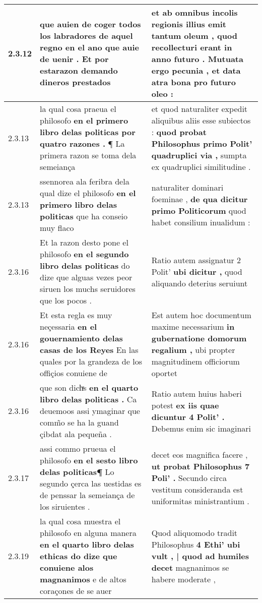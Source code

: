 \begin{tabular}{|p{1cm}|p{6.5cm}|p{6.5cm}|}
2.3.12 & que auien de coger todos los labradores de aquel regno \textbf{ en el ano que auie de uenir . } Et por estarazon demando dineros prestados & et ab omnibus incolis regionis illius emit tantum oleum , \textbf{ quod recollecturi erant in anno futuro . } Mutuata ergo pecunia , et data atra bona pro futuro oleo : \\\hline
2.3.13 & la qual cosa praeua el philosofo \textbf{ en el primero libro delas politicas por quatro razones . } ¶ La primera razon se toma dela semeiança & et quod naturaliter expedit aliquibus aliis esse subiectos : \textbf{ quod probat Philosophus primo Polit’ quadruplici via , } sumpta ex quadruplici similitudine . \\\hline
2.3.13 & ssennorea ala feribra dela qual dize el philosofo \textbf{ en el primero libro delas politicas } que ha conseio muy flaco & naturaliter dominari foeminae , \textbf{ de qua dicitur primo Politicorum } quod habet consilium inualidum : \\\hline
2.3.16 & Et la razon desto pone el philosofo \textbf{ en el segundo libro delas politicas } do dize que alguas vezes peor siruen los muchs seruidores que los pocos . & Ratio autem assignatur 2 Polit’ \textbf{ ubi dicitur , } quod aliquando deterius seruiunt \\\hline
2.3.16 & Et esta regla es muy neçessaria \textbf{ en el gouernamiento delas casas de los Reyes } En las quales por la grandeza de los offiçios conuiene de & Est autem hoc documentum maxime necessarium \textbf{ in gubernatione domorum regalium , } ubi propter magnitudinem officiorum oportet \\\hline
2.3.16 & que son dichͣs \textbf{ en el quarto libro delas politicas . } Ca deuemoos assi ymaginar que comm̃o se ha la guand çibdat ala pequeña . & Ratio autem huius haberi potest \textbf{ ex iis quae dicuntur 4 Polit’ . } Debemus enim sic imaginari \\\hline
2.3.17 & assi commo prueua el philosofo \textbf{ en el sesto libro delas politicas¶ } Lo segundo çerca las uestidas es de penssar la semeiança de los siruientes . & decet eos magnifica facere , \textbf{ ut probat Philosophus 7 Poli’ . } Secundo circa vestitum consideranda est uniformitas ministrantium . \\\hline
2.3.19 & la qual cosa muestra el philosofo en alguna manera \textbf{ en el quarto libro delas ethicas do dize que conuiene alos magnanimos } e de altos coraçones de se auer & Quod aliquomodo tradit Philosophus \textbf{ 4 Ethi’ ubi vult , | quod ad humiles decet } magnanimos se habere moderate , \\\hline

\end{tabular}
